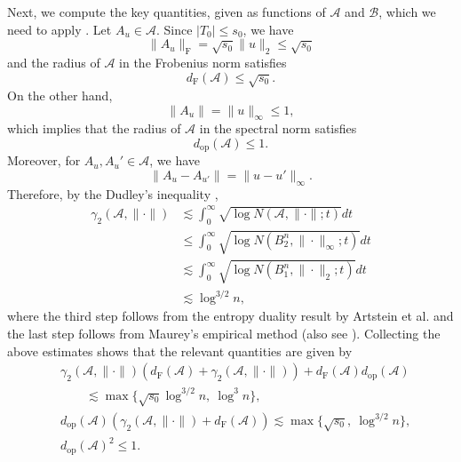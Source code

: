 \documentclass[11pt,journal]{IEEEtran}
\newcommand{\rmF}{\mathrm{F}}
\newcommand{\norm}[1]{\|{#1}\|}
\begin{document}
\begin{IEEEproof}
Next, we compute the key quantities, given as functions of $\mathcal{A}$ and $\mathcal{B}$, which we need to apply \cite[Theorem 2.3]{Lee2015b}. Let $A_u \in \mathcal{A}$. 
Since $|T_0| \leq s_0$, we have
\[
\norm{A_u}_\rmF = \sqrt{s_0} \norm{u}_2 \leq \sqrt{s_0}
\]
and the radius of $\mathcal{A}$ in the Frobenius norm satisfies
\[
d_\rmF(\mathcal{A}) \leq \sqrt{s_0}. 
\]
On the other hand, 
\[
\norm{A_u} = \norm{u}_\infty \leq 1, 
\]
which implies that the radius of $\mathcal{A}$ in the spectral norm satisfies
\[
d_{\mathrm{op}}(\mathcal{A}) \leq 1. 
\]
Moreover, for $A_u, A_u' \in \mathcal{A}$, we have
\[
\norm{A_{u} - A_{u'}} = \norm{u - u'}_\infty.
\]
Therefore, by the Dudley's inequality \cite{Ledoux2013}, 
\begin{align*}
\gamma_2(\mathcal{A},\norm{\cdot})
& \lesssim \int_0^\infty \sqrt{\log N(\mathcal{A},\norm{\cdot};t)} dt \\
& \leq \int_0^\infty \sqrt{\log N(B_2^n,\norm{\cdot}_\infty;t)} dt \\
& \lesssim \int_0^\infty \sqrt{\log N(B_1^n,\norm{\cdot}_2;t)} dt \\
& \lesssim \log^{3/2} n,
\end{align*}
where the third step follows from the entropy duality result by Artstein et al. \cite{Artstein2004} and the last step follows from Maurey's empirical method \cite{Carl1985} (also see \cite[Lemma 3.1]{Junge2017}).
Collecting the above estimates shows that the relevant quantities are given by
\begin{align*}
& \gamma_2(\mathcal{A},\norm{\cdot}) (d_{\mathrm{F}}(\mathcal{A})+\gamma_2(\mathcal{A},\norm{\cdot})) + d_{\mathrm{F}}(\mathcal{A}) d_{\mathrm{op}}(\mathcal{A}) \\
& \qquad \lesssim \max\{\sqrt{s_0} \log^{3/2} n,~ \log^3 n \}, \\
& d_{\mathrm{op}}(\mathcal{A})(\gamma_2(\mathcal{A},\norm{\cdot}) + d_{\mathrm{F}}(\mathcal{A})) \lesssim \max\{\sqrt{s_0},~ \log^{3/2} n \}, \\
& d_{\mathrm{op}}(\mathcal{A})^2 \leq 1.
\end{align*}


\end{IEEEproof}
\end{document}
